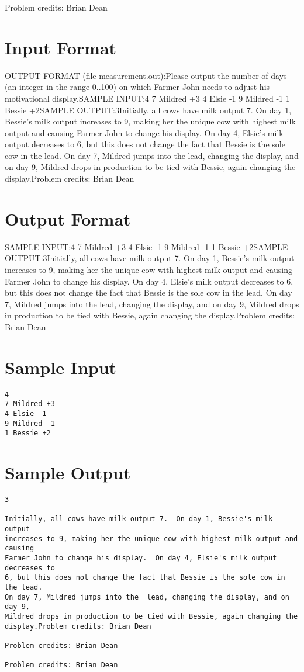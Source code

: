 \documentclass[12pt]{article}
\begin{document}
Problem credits: Brian Dean



\section*{Input Format}
OUTPUT FORMAT (file measurement.out):Please output the number of days (an integer in the range 0..100) on which
Farmer John needs to adjust his motivational display.SAMPLE INPUT:4
7 Mildred +3
4 Elsie -1
9 Mildred -1
1 Bessie +2SAMPLE OUTPUT:3Initially, all cows have milk output 7.  On day 1, Bessie's milk output
increases to 9, making her the unique cow with highest milk output and causing
Farmer John to change his display.  On day 4, Elsie's milk output decreases to
6, but this does not change the fact that Bessie is the sole cow in the lead. 
On day 7, Mildred jumps into the  lead, changing the display, and on day 9,
Mildred drops in production to be tied with Bessie, again changing the display.Problem credits: Brian Dean

\section*{Output Format}
SAMPLE INPUT:4
7 Mildred +3
4 Elsie -1
9 Mildred -1
1 Bessie +2SAMPLE OUTPUT:3Initially, all cows have milk output 7.  On day 1, Bessie's milk output
increases to 9, making her the unique cow with highest milk output and causing
Farmer John to change his display.  On day 4, Elsie's milk output decreases to
6, but this does not change the fact that Bessie is the sole cow in the lead. 
On day 7, Mildred jumps into the  lead, changing the display, and on day 9,
Mildred drops in production to be tied with Bessie, again changing the display.Problem credits: Brian Dean

\section*{Sample Input}
\begin{verbatim}
4
7 Mildred +3
4 Elsie -1
9 Mildred -1
1 Bessie +2
\end{verbatim}

\section*{Sample Output}
\begin{verbatim}
3

Initially, all cows have milk output 7.  On day 1, Bessie's milk output
increases to 9, making her the unique cow with highest milk output and causing
Farmer John to change his display.  On day 4, Elsie's milk output decreases to
6, but this does not change the fact that Bessie is the sole cow in the lead. 
On day 7, Mildred jumps into the  lead, changing the display, and on day 9,
Mildred drops in production to be tied with Bessie, again changing the display.Problem credits: Brian Dean

Problem credits: Brian Dean

Problem credits: Brian Dean
\end{verbatim}
\end{document}
